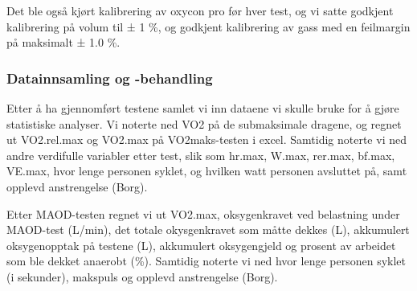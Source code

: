 \documentclass[
  letterpaper,
  DIV=11,
  numbers=noendperiod]{scrartcl}
\begin{document}
Det ble også kjørt kalibrering av oxycon pro før hver test, og vi satte
godkjent kalibrering på volum til ± 1 \%, og godkjent kalibrering av
gass med en feilmargin på maksimalt ± 1.0 \%.

\hypertarget{datainnsamling-og--behandling}{%
\subsubsection{Datainnsamling og
-behandling}\label{datainnsamling-og--behandling}}

Etter å ha gjennomført testene samlet vi inn dataene vi skulle bruke for
å gjøre statistiske analyser. Vi noterte ned VO2 på de submaksimale
dragene, og regnet ut VO2.rel.max og VO2.max på VO2maks-testen i excel.
Samtidig noterte vi ned andre verdifulle variabler etter test, slik som
hr.max, W.max, rer.max, bf.max, VE.max, hvor lenge personen syklet, og
hvilken watt personen avsluttet på, samt opplevd anstrengelse (Borg).

Etter MAOD-testen regnet vi ut VO2.max, oksygenkravet ved belastning
under MAOD-test (L/min), det totale okysgenkravet som måtte dekkes (L),
akkumulert oksygenopptak på testene (L), akkumulert oksygengjeld og
prosent av arbeidet som ble dekket anaerobt (\%). Samtidig noterte vi
ned hvor lenge personen syklet (i sekunder), makspuls og opplevd
anstrengelse (Borg).
\end{document}
